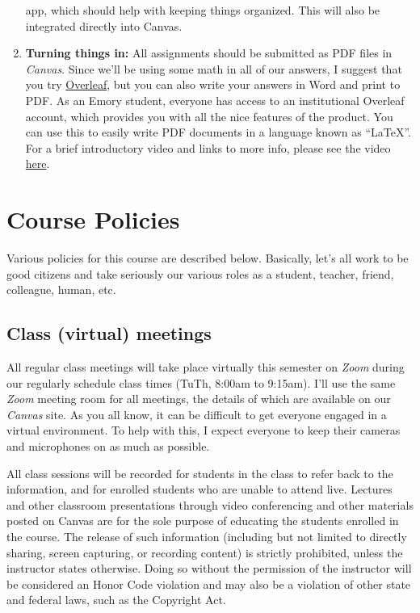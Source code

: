 \documentclass[11pt,]{article}
\begin{document}
\begin{enumerate}
  app, which should help with keeping things organized. This will also
  be integrated directly into Canvas.
\item
  \textbf{Turning things in:} All assignments should be submitted as PDF
  files in \emph{Canvas}. Since we'll be using some math in all of our
  answers, I suggest that you try
  \href{https://www.overleaf.com/}{Overleaf}, but you can also write
  your answers in Word and print to PDF. As an Emory student, everyone
  has access to an institutional Overleaf account, which provides you
  with all the nice features of the product. You can use this to easily
  write PDF documents in a language known as ``LaTeX''. For a brief
  introductory video and links to more info, please see the video
  \href{https://www.overleaf.com/learn/latex/Questions/Getting_started_with_LaTeX_and_Overleaf_(formerly_writeLaTeX)}{here}.
\end{enumerate}

\hypertarget{course-policies}{%
\section{Course Policies}\label{course-policies}}

Various policies for this course are described below. Basically, let's
all work to be good citizens and take seriously our various roles as a
student, teacher, friend, colleague, human, etc.

\hypertarget{class-virtual-meetings}{%
\subsection{Class (virtual) meetings}\label{class-virtual-meetings}}

All regular class meetings will take place virtually this semester on
\emph{Zoom} during our regularly schedule class times (TuTh, 8:00am to
9:15am). I'll use the same \emph{Zoom} meeting room for all meetings,
the details of which are available on our \emph{Canvas} site. As you all
know, it can be difficult to get everyone engaged in a virtual
environment. To help with this, I expect everyone to keep their cameras
and microphones on as much as possible.

All class sessions will be recorded for students in the class to refer
back to the information, and for enrolled students who are unable to
attend live. Lectures and other classroom presentations through video
conferencing and other materials posted on Canvas are for the sole
purpose of educating the students enrolled in the course. The release of
such information (including but not limited to directly sharing, screen
capturing, or recording content) is strictly prohibited, unless the
instructor states otherwise. Doing so without the permission of the
instructor will be considered an Honor Code violation and may also be a
violation of other state and federal laws, such as the Copyright Act.
\end{document}
